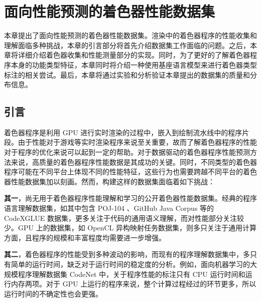 
\chapter{面向性能预测的着色器性能数据集}
\label{sec:perf_data_set_chap}

{\added 本章提出了面向性能预测的着色器性能数据集。渲染中的着色器程序的性能收集和理解面临多种挑战，本章的引言部分将首先介绍数据集工作面临的问题。之后，本章将详细介绍着色器收集和性能测量部分的实现。同时，为了更好的了解着色器程序本身的功能类型特征，本章同时将介绍一种使用基座语言模型来进行着色器类型标注的相关尝试。最后，本章将通过实验和分析验证本章提出的数据集的质量和分布信息。}

\section{引言}

{\amend 着色器程序是利用 GPU 进行实时渲染的过程中，嵌入到绘制流水线中的程序片段。由于性能对于游戏等实时渲染程序来说至关重要，故而了解着色器程序的性能对于程序的优化来说可以起到一定的帮助。对于数据驱动的着色器程序性能预测方法来说，高质量的着色器程序性能数据是其成功的关键。同时，不同类型的着色器程序可能在不同平台上体现不同的性能特征，这些行为也需要跨越不同平台的着色器性能数据集加以刻画。然而，构建这样的数据集面临着如下挑战：

{\bf 其一}，尚无用于着色器程序性能理解和学习的公开着色器性能数据集。经典的程序语言理解数据集，如其中包含 POJ-104 \cite{10.5555/3015812.3016002}、GitHub Java Corpus 等的 CodeXGLUE 数据集\cite{DBLP:journals/corr/abs-2102-04664}，更多关注于代码的通用语义理解，而对性能部分关注较少。GPU 上的数据集，如 OpenCL 异构映射任务数据集\cite{8091247}，则多只关注于通用计算方面，且程序的规模和丰富程度均需要进一步增强。

{\bf 其二}，着色器程序的性能受到多种波动的影响，而现有的程序理解数据集中，多只有简单的运行时间，缺乏对于运行时间的稳定度的分析。例如，面向机器学习的大规模程序理解数据集 CodeNet \cite{DBLP:journals/corr/abs-2105-12655} 中，关于程序性能的标注只有 CPU 运行时间和运行内存两项。对于 GPU 上运行的程序来说，整个计算过程经过的环节更多，所以运行时间的不确定性也会更强。}

